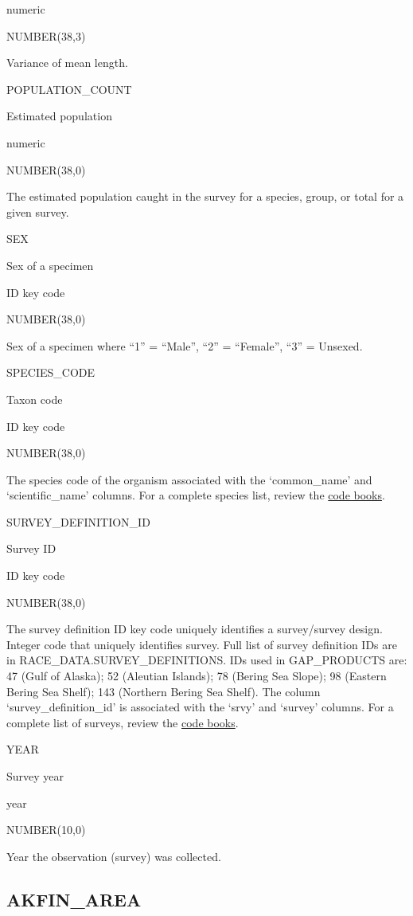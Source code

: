 \documentclass[
  letterpaper,
  oneside,
  open=any]{scrbook}
\begin{document}
numeric

NUMBER(38,3)

Variance of mean length.

POPULATION\_COUNT

Estimated population

numeric

NUMBER(38,0)

The estimated population caught in the survey for a species, group, or
total for a given survey.

SEX

Sex of a specimen

ID key code

NUMBER(38,0)

Sex of a specimen where ``1'' = ``Male'', ``2'' = ``Female'', ``3'' =
Unsexed.

SPECIES\_CODE

Taxon code

ID key code

NUMBER(38,0)

The species code of the organism associated with the `common\_name' and
`scientific\_name' columns. For a complete species list, review the
\href{https://www.fisheries.noaa.gov/resource/document/groundfish-survey-species-code-manual-and-data-codes-manual}{code
books}.

SURVEY\_DEFINITION\_ID

Survey ID

ID key code

NUMBER(38,0)

The survey definition ID key code uniquely identifies a survey/survey
design. Integer code that uniquely identifies survey. Full list of
survey definition IDs are in RACE\_DATA.SURVEY\_DEFINITIONS. IDs used in
GAP\_PRODUCTS are: 47 (Gulf of Alaska); 52 (Aleutian Islands); 78
(Bering Sea Slope); 98 (Eastern Bering Sea Shelf); 143 (Northern Bering
Sea Shelf). The column `survey\_definition\_id' is associated with the
`srvy' and `survey' columns. For a complete list of surveys, review the
\href{https://www.fisheries.noaa.gov/resource/document/groundfish-survey-species-code-manual-and-data-codes-manual}{code
books}.

YEAR

Survey year

year

NUMBER(10,0)

Year the observation (survey) was collected.

\hypertarget{akfin_area}{%
\subsection{AKFIN\_AREA}\label{akfin_area}}
\end{document}
